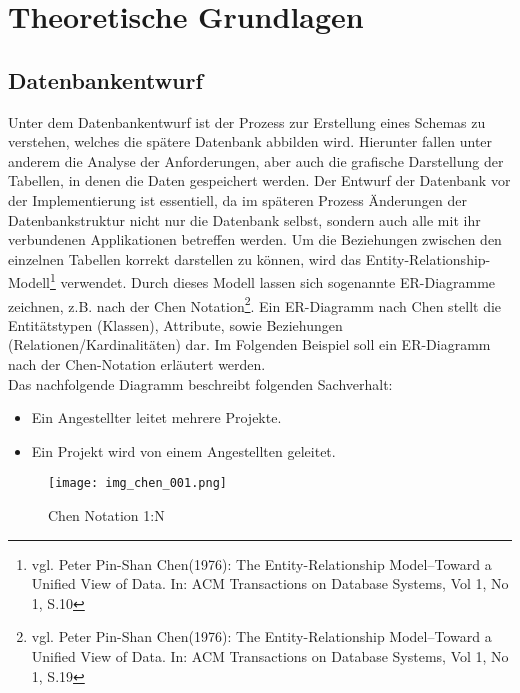 \chapter{Theoretische Grundlagen}
\label{cha:theogrund}

\section{Datenbankentwurf}
\label{sec:erm}

Unter dem Datenbankentwurf ist der Prozess zur Erstellung eines Schemas zu verstehen, welches die spätere Datenbank abbilden wird.
Hierunter fallen unter anderem die Analyse der Anforderungen, aber auch die grafische Darstellung der Tabellen, in denen die Daten gespeichert werden.
Der Entwurf der Datenbank vor der Implementierung ist essentiell, da im späteren Prozess Änderungen der Datenbankstruktur nicht nur die Datenbank selbst, sondern auch alle mit ihr verbundenen Applikationen betreffen werden.
Um die Beziehungen zwischen den einzelnen Tabellen korrekt darstellen zu können, wird das Entity-Relationship-Modell\footnote{vgl. Peter Pin-Shan Chen(1976): The Entity-Relationship Model--Toward a Unified View of Data. In: ACM Transactions on Database Systems, Vol 1, No 1, S.10} verwendet.
Durch dieses Modell lassen sich sogenannte ER-Diagramme zeichnen, z.B. nach der Chen Notation\footnote{vgl. Peter Pin-Shan Chen(1976): The Entity-Relationship Model--Toward a Unified View of Data. In: ACM Transactions on Database Systems, Vol 1, No 1, S.19}.
Ein ER-Diagramm nach Chen stellt die Entitätstypen (Klassen), Attribute, sowie Beziehungen (Relationen/Kardinalitäten) dar.
Im Folgenden Beispiel soll ein ER-Diagramm nach der Chen-Notation erläutert werden.\\

Das nachfolgende Diagramm beschreibt folgenden Sachverhalt:

\begin{itemize}
\item Ein Angestellter leitet mehrere Projekte.
\item Ein Projekt wird von einem Angestellten geleitet.
\end{itemize}

\begin{figure}[H]
\begin{center}
\texttt{[image: img\_chen\_001.png]}
\caption{Chen Notation 1:N}
\label{chenpic1}
\end{center}
\end{figure}

